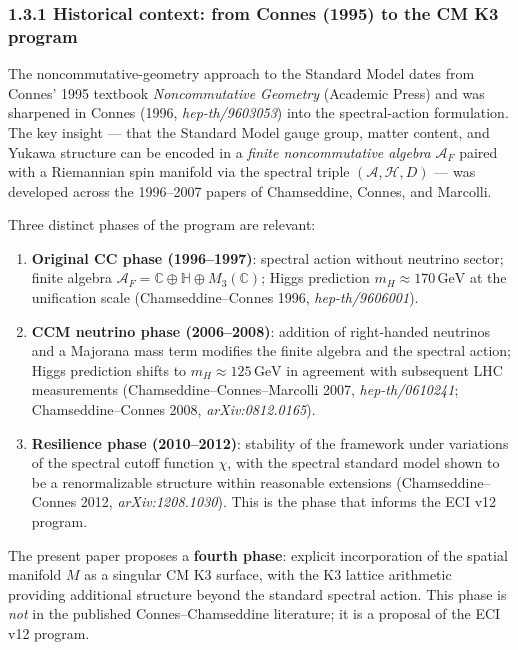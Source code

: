\documentclass[
  11pt,
  a4paper,
]{article}
\begin{document}
\hypertarget{historical-context-from-connes-1995-to-the-cm-k3-program}{%
\subsubsection{1.3.1 Historical context: from Connes (1995) to the CM K3 program}\label{historical-context-from-connes-1995-to-the-cm-k3-program}}

The noncommutative-geometry approach to the Standard Model dates from Connes' 1995 textbook \emph{Noncommutative Geometry} (Academic Press) and was sharpened in Connes (1996, \emph{hep-th/9603053}) into the spectral-action formulation. The key insight --- that the Standard Model gauge group, matter content, and Yukawa structure can be encoded in a \emph{finite noncommutative algebra} \(\mathcal A_F\) paired with a Riemannian spin manifold via the spectral triple \((\mathcal A, \mathcal H, D)\) --- was developed across the 1996--2007 papers of Chamseddine, Connes, and Marcolli.

Three distinct phases of the program are relevant:

\begin{enumerate}
\def\labelenumi{(\alph{enumi})}
\item
  \textbf{Original CC phase (1996--1997)}: spectral action without neutrino sector; finite algebra \(\mathcal A_F = \mathbb C \oplus \mathbb H \oplus M_3(\mathbb C)\); Higgs prediction \(m_H \approx 170\,\mathrm{GeV}\) at the unification scale (Chamseddine--Connes 1996, \emph{hep-th/9606001}).
\item
  \textbf{CCM neutrino phase (2006--2008)}: addition of right-handed neutrinos and a Majorana mass term modifies the finite algebra and the spectral action; Higgs prediction shifts to \(m_H \approx 125\,\mathrm{GeV}\) in agreement with subsequent LHC measurements (Chamseddine--Connes--Marcolli 2007, \emph{hep-th/0610241}; Chamseddine--Connes 2008, \emph{arXiv:0812.0165}).
\item
  \textbf{Resilience phase (2010--2012)}: stability of the framework under variations of the spectral cutoff function \(\chi\), with the spectral standard model shown to be a renormalizable structure within reasonable extensions (Chamseddine--Connes 2012, \emph{arXiv:1208.1030}). This is the phase that informs the ECI v12 program.
\end{enumerate}

The present paper proposes a \textbf{fourth phase}: explicit incorporation of the spatial manifold \(M\) as a singular CM K3 surface, with the K3 lattice arithmetic providing additional structure beyond the standard spectral action. This phase is \emph{not} in the published Connes--Chamseddine literature; it is a proposal of the ECI v12 program.
\end{document}
